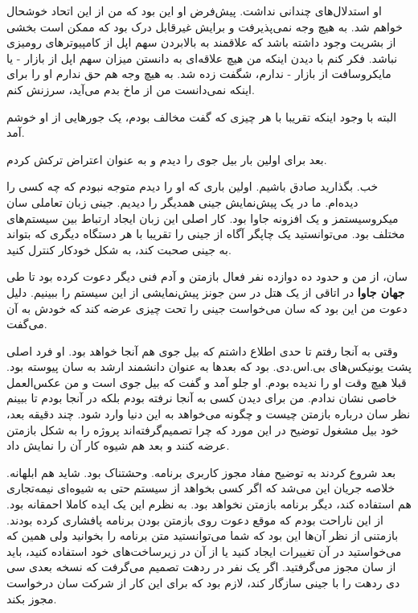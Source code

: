 او استدلال‌های چندانی نداشت. پیش‌فرض او این بود که من از این اتحاد
خوشحال خواهم شد. به هیچ وجه نمی‌پذیرفت و برایش غیرقابل درک بود که ممکن
است بخشی از بشریت وجود داشته باشد که علاقمند به بالابردن سهم اپل از
کامپیوترهای رومیزی نباشد. فکر کنم با دیدن اینکه من هیچ علاقه‌ای به
دانستن میزان سهم اپل از بازار - یا مایکروسافت از بازار - ندارم، شگفت
زده شد. به هیچ وجه هم حق ندارم او را برای اینکه نمی‌دانست من از ماخ بدم
می‌آید، سرزنش کنم.

البته با وجود اینکه تقریبا با هر چیزی که گفت مخالف بودم، یک جورهایی از
او خوشم آمد.

بعد برای اولین بار بیل جوی را دیدم و به عنوان
اعتراض ترکش کردم.

خب. بگذارید صادق باشیم. اولین باری که او را دیدم متوجه نبودم که چه کسی
را دیده‌ام. ما در یک پیش‌نمایش جینی همدیگر را
دیدیم. جینی زبان تعاملی سان میکروسیستمز و یک افزونه جاوا بود. کار اصلی
این زبان ایجاد ارتباط بین سیستم‌های مختلف بود. می‌توانستید یک چاپگر آگاه
از جینی را تقریبا با هر دستگاه دیگری که بتواند به جینی صحبت کند، به
شکل خودکار کنترل کنید.

سان، از من و حدود ده دوازده نفر فعال بازمتن و آدم فنی دیگر دعوت کرده
بود تا طی \textbf{جهان جاوا} در اتاقی از یک هتل
در سن جونز پیش‌نمایشی از این سیستم را ببینیم. دلیل دعوت من این بود که
سان می‌خواست جینی را تحت چیزی عرضه کند که خودش به آن 
می‌گفت.

وقتی به آنجا رفتم تا حدی اطلاع داشتم که بیل جوی هم آنجا خواهد بود. او
فرد اصلی پشت یونیکس‌های بی.اس.دی. بود که بعدها به عنوان دانشمند ارشد به
سان پیوسته بود. قبلا هیچ وقت او را ندیده بودم. او جلو آمد و گفت که بیل
جوی است و من عکس‌العمل خاصی نشان ندادم. من برای دیدن کسی به آنجا نرفته
بودم بلکه در آنجا بودم تا ببینم نظر سان درباره بازمتن چیست و چگونه
می‌خواهد به این دنیا وارد شود. چند دقیقه بعد، خود بیل مشغول توضیح در
این مورد که چرا تصمیم‌گرفته‌اند پروژه را به شکل بازمتن عرضه کنند و بعد
هم شیوه کار آن را نمایش داد.

بعد شروع کردند به توضیح مفاد مجوز کاربری برنامه. وحشتناک بود. شاید هم
ابلهانه. خلاصه جریان این می‌شد که اگر کسی بخواهد از سیستم حتی به شیوه‌ای
نیمه‌تجاری هم استفاده کند، دیگر برنامه بازمتن نخواهد بود. به نظرم این
یک ایده کاملا احمقانه بود. از این ناراحت بودم که موقع دعوت روی بازمتن
بودن برنامه پافشاری کرده بودند. بازمتنی از نظر آن‌ها این بود که شما
می‌توانستید متن برنامه را بخوانید ولی همین که می‌خواستید در آن تغییرات
ایجاد کنید یا از آن در زیرساخت‌های خود استفاده کنید، باید از سان مجوز
می‌گرفتید. اگر یک نفر در ردهت تصمیم می‌گرفت که نسخه بعدی سی دی ردهت را
با جینی سازگار کند، لازم بود که برای این کار از شرکت سان درخواست مجوز
بکند.

